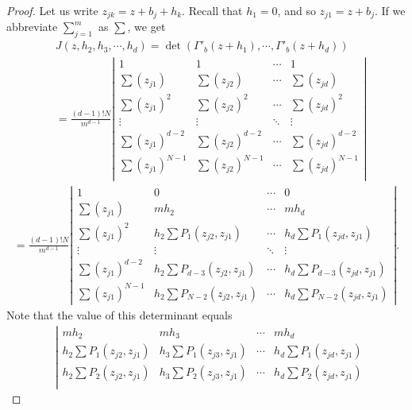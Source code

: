 \documentclass[11 pt]{amsart}
\theoremstyle{plain}
\numberwithin{equation}{section}
\theoremstyle{plain}
\numberwithin{equation}{section}
\theoremstyle{remark}
\begin{document}
\begin{proof}
Let us write $z_{jk} = z+b_j + h_k$. Recall that $h_1=0$, and so $z_{j1} = z+b_{j}$. If we abbreviate $\sum_{j=1}^m$ as $\sum$, we get
\begin{align*}
&J(z, h_2, h_3, \cdots, h_d) = \det (\Gamma'_b(z+h_1), \cdots, \Gamma'_b(z+h_d)) \\
& = \frac{(d-1)!N}{m^{d-1}}
\left|
\begin{array}{cccc}
 1 & 1  & \cdots & 1\\
\sum ({z_{j{1}}})  & \sum (z_{j2})  & \cdots & \sum (z_{jd})\\
\sum({z_{j{1}}})^2  & \sum(z_{j2})^2  & \cdots & \sum (z_{jd})^2\\
\vdots & \vdots & \ddots & \vdots \\
\sum({z_{j{1}}})^{d-2}  & \sum(z_{j2})^{d-2}  & \cdots & \sum (z_{jd})^{d-2}\\
\sum({z_{j{1}}})^{N-1}  & \sum(z_{j2})^{N-1}  & \cdots & \sum (z_{jd})^{N-1}\\
\end{array}
\right|
\end{align*}
\begin{align*}
 = \frac{(d-1)!N}{m^{d-1}}
\left|
\begin{array}{cccc}
1  &  0  & \cdots & 0 \\
\sum ({z_{j{1}}}) & mh_2 & \cdots & m h_d \\
\sum({z_{j{1}}})^2 & h_2 \sum P_1({z_{j{{2}}}}, {z_{j{1}}}) & \cdots & h_d \sum P_1({z_{j{{d}}}}, {z_{j{1}}}) \\
\vdots & \vdots  & \ddots & \vdots \\
\sum ({z_{j{1}}})^{d-2} & h_2 \sum P_{d-3}({z_{j{{2}}}}, {z_{j{1}}}) & \cdots & h_d \sum P_{d-3}({z_{j{{d}}}},{z_{j{1}}}) \\
\sum({z_{j{1}}})^{N-1} & h_2 \sum P_{N-2}({z_{j{{2}}}}, {z_{j{1}}}) & \cdots & h_d \sum P_{N-2} ({z_{j{{d}}}}, {z_{j{1}}})
\end{array}
\right| .
\end{align*}
Note that the value of this determinant equals
\begin{align*}
&\left|
\begin{array}{cccc}
m h_2  &  m h_3  & \cdots & m h_d \\
h_2 \sum P_1({z_{j{{2}}}},{z_{j{1}}}) & h_3 \sum P_1({z_{j{{3}}}},{z_{j{1}}})  & \cdots & h_d \sum P_1({z_{j{{d}}}},{z_{j{1}}}) \\
h_2 \sum P_2({z_{j{{2}}}},{z_{j{1}}}) &  h_3 \sum P_2({z_{j{{3}}}}, {z_{j{1}}}) & \cdots & h_d \sum P_2({z_{j{{d}}}},{z_{j{1}}}) \\

\end{array}
\end{align*}
\end{proof}
\end{document}
